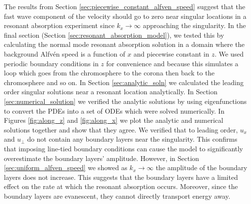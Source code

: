 \documentclass[linenumbers]{aastex63}
\begin{document}
The results from Section \ref{sec:piecewise_constant_alfven_speed} suggest that the fast wave component of the velocity should go to zero near singular locations in a resonant absorption experiment since $k_x\rightarrow \infty$ approaching the singularity. In the final section (Section \ref{sec:resonant_absorption_model}), we tested this by calculating the normal mode resonant absorption solution in a domain where the background Alfv\'en speed is a function of $x$ and piecewise constant in $z$. We used periodic boundary conditions in $z$ for convenience and because this simulates a loop which goes from the chromosphere to the corona then back to the chromosphere and so on. In Section \ref{sec:analytic_soln} we calculated the leading order singular solutions near a resonant location analytically. In Section \ref{sec:numerical_solution} we verified the analytic solutions by using eigenfunctions to convert the PDEs into a set of ODEs which were solved numerically. In Figures \ref{fig:along_z} and \ref{fig:along_x} we plot the analytic and numerical solutions together and show that they agree. We verified that to leading order, $u_x$ and $u_\perp$ do not contain any boundary layers near the singularity. This confirms that imposing line-tied boundary conditions can cause the model to significantly overestimate the boundary layers' amplitude. However, in Section \ref{sec:uniform_alfven_speed} we showed as $k_x\rightarrow\infty$ the amplitude of the boundary layers does not increase. This suggests that the boundary layers have a limited effect on the rate at which the resonant absorption occurs. Moreover, since the boundary layers are evanescent, they cannot directly transport energy away.
\end{document}
